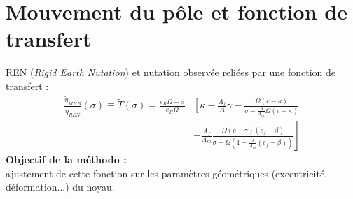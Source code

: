 \section{Mouvement du pôle et fonction de transfert}

\begin{frame}
   REN (\textit{Rigid Earth Nutation}) et nutation observée reliées par une fonction de transfert :
   \begin{align*}
     \frac{\tilde{\eta}_{MHB}}{\tilde{\eta}_{REN}}(\sigma) 
     \equiv \tilde{T}(\sigma) 
     = \frac{e_R\Omega-\sigma}{e_R\Omega} &\left[ \kappa - \frac{A_f}{A}\gamma\right.- \frac{\Omega(e-\kappa)}{\sigma-\frac{A}{A_m}\Omega(e-\kappa)}\\
     &-\left. \frac{A_f}{A_m} \frac{\Omega (e-\gamma)(e_f-\beta)}{\sigma + \Omega(1+ \frac{A}{A_m}(e_f-\beta))}\right]
   \end{align*}
   	 \textbf{Objectif de la méthodo :} 
   	\\ajustement de cette fonction sur les paramètres géométriques (excentricité, déformation...) du noyau. 
\end{frame}

